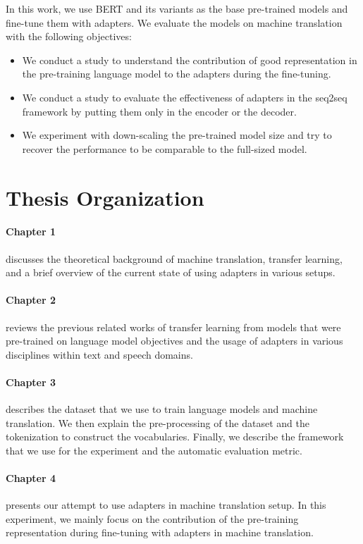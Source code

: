 In this work, we use BERT and its variants as the base pre-trained models and fine-tune them with adapters. We evaluate the models on machine translation with the following objectives:
\begin{itemize}
    \item We conduct a study to understand the contribution of good representation in the pre-training language model to the adapters during the fine-tuning.
    \item We conduct a study to evaluate the effectiveness of adapters in the seq2seq framework by putting them only in the encoder or the decoder.
    \item We experiment with down-scaling the pre-trained model size and try to recover the performance to be comparable to the full-sized model.
\end{itemize}

\section*{Thesis Organization}

\paragraph{Chapter 1} discusses the theoretical background of machine translation, transfer learning, and a brief overview of the current state of using adapters in various setups.

\paragraph{Chapter 2} reviews the previous related works of transfer learning from models that were pre-trained on language model objectives and the usage of adapters in various disciplines within text and speech domains.

\paragraph{Chapter 3} describes the dataset that we use to train language models and machine translation. We then explain the pre-processing of the dataset and the tokenization to construct the vocabularies. Finally, we describe the framework that we use for the experiment and the automatic evaluation metric.

\paragraph{Chapter 4} presents our attempt to use adapters in machine translation setup. In this experiment, we mainly focus on the contribution of the pre-training representation during fine-tuning with adapters in machine translation.

